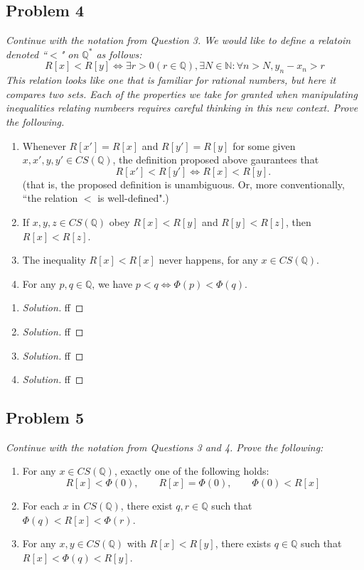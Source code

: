 \documentclass{article}
\newcommand{\N}{{\mathbb N}}
\newcommand{\Q}{{\mathbb Q}}
\begin{document}
\subsection*{Problem 4}
{\it Continue with the notation from Question 3.
	We would like to define a relatoin denoted ``$<$" on $\Q^*$ as follows:
	\[
		R[x] < R[y] \iff \exists r > 0 (r \in \Q), \exists N \in \N
		\colon \forall n > N, y_n - x_n > r
	\]
	This relation looks like one that is familiar for rational numbers,
	but here it compares two \emph{sets}.
	Each of the properties we take for granted when manipulating inequalities
	relating numbeers requires careful thinking in this new context.
	Prove the following.
\begin{enumerate}
	\item Whenever $R[x'] = R[x]$ and $R[y'] = R[y]$
		for some given $x,x',y,y' \in CS(\Q)$,
		the definition proposed above gaurantees that
		\[
			R[x'] < R[y'] \iff R[x] < R[y].
		\]
		(that is, the proposed definition is unambiguous.
		Or, more conventionally,
		``the relation $<$ is well-defined".)
	\item If $x,y,z \in CS(\Q)$ obey $R[x] < R[y]$ and $R[y] < R[z]$,
		then $R[x] < R[z]$.
	\item The inequality $R[x] < R[x]$ never happens, for any $x \in CS(\Q)$.
	\item For any $p,q \in \Q$, we have $p<q \iff \Phi(p) < \Phi(q)$.
\end{enumerate}}

\begin{enumerate}
	\item \begin{proof}[Solution]\let\qed\relax
		ff
	\end{proof}
	\item \begin{proof}[Solution]\let\qed\relax
		ff
	\end{proof}
	\item \begin{proof}[Solution]\let\qed\relax
		ff
	\end{proof}
	\item \begin{proof}[Solution]\let\qed\relax
		ff
	\end{proof}
\end{enumerate}
\clearpage

\subsection*{Problem 5}
{\it Continue with the notation from Questions 3 and 4. Prove the following:
\begin{enumerate}
	\item For any $x \in CS(\Q)$, exactly one of the following holds:
		\[
			R[x] < \Phi(0), \qquad R[x] = \Phi(0), \qquad \Phi(0) < R[x]
		\]
	\item For each $x$ in $CS(\Q)$, there exist $q,r\in\Q$
		such that $\Phi(q) < R[x] < \Phi(r)$.
	\item For any $x,y \in CS(\Q)$ with $R[x] < R[y]$,
		there exists $q \in \Q$ such that $R[x] < \Phi(q) < R[y]$.
\end{enumerate}}
\end{document}
